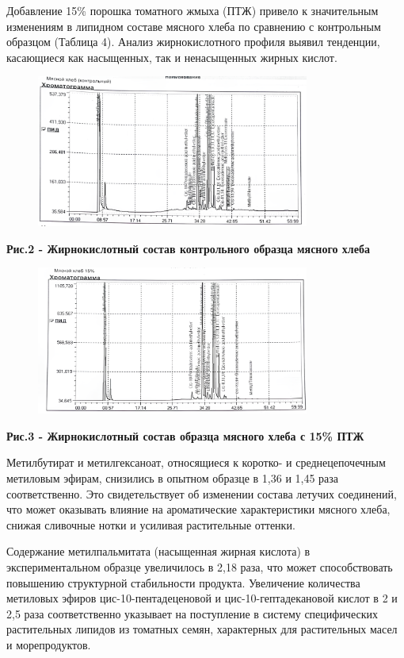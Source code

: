 Добавление 15\% порошка томатного жмыха (ПТЖ) привело к значительным
изменениям в липидном составе мясного хлеба по сравнению с контрольным
образцом (Таблица 4). Анализ жирнокислотного профиля выявил тенденции,
касающиеся как насыщенных, так и ненасыщенных жирных кислот.


\begin{figure}[H]
	\centering
	\includegraphics[width=0.8\textwidth]{media/pish2/image73}
	\caption*{}
\end{figure}


{\bfseries Рис.2 - Жирнокислотный состав контрольного образца мясного
хлеба}


\begin{figure}[H]
	\centering
	\includegraphics[width=0.8\textwidth]{media/pish2/image74}
	\caption*{}
\end{figure}


{\bfseries Рис.3 - Жирнокислотный состав образца мясного хлеба с 15\% ПТЖ}

Метилбутират и метилгексаноат, относящиеся к коротко- и среднецепочечным
метиловым эфирам, снизились в опытном образце в 1,36 и 1,45 раза
соответственно. Это свидетельствует об изменении состава летучих
соединений, что может оказывать влияние на ароматические характеристики
мясного хлеба, снижая сливочные нотки и усиливая растительные оттенки.

Содержание метилпальмитата (насыщенная жирная кислота) в
экспериментальном образце увеличилось в 2,18 раза, что может
способствовать повышению структурной стабильности продукта. Увеличение
количества метиловых эфиров цис-10-пентадеценовой и
цис-10-гептадекановой кислот в 2 и 2,5 раза соответственно указывает на
поступление в систему специфических растительных липидов из томатных
семян, характерных для растительных масел и морепродуктов.


